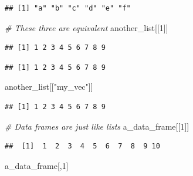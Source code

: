 \documentclass[]{book}
\newenvironment{Shaded}{\begin{snugshade}}{\end{snugshade}}
\newcommand{\CommentTok}[1]{\textcolor[rgb]{0.56,0.35,0.01}{\textit{#1}}}
\newcommand{\DecValTok}[1]{\textcolor[rgb]{0.00,0.00,0.81}{#1}}
\newcommand{\NormalTok}[1]{#1}
\newcommand{\OperatorTok}[1]{\textcolor[rgb]{0.81,0.36,0.00}{\textbf{#1}}}
\newcommand{\StringTok}[1]{\textcolor[rgb]{0.31,0.60,0.02}{#1}}
\begin{document}
\begin{enumerate}
\begin{verbatim}
## [1] "a" "b" "c" "d" "e" "f"
\end{verbatim}

\begin{Shaded}
\begin{Highlighting}[]
\CommentTok{# These three are equivalent}
\NormalTok{another_list[[}\DecValTok{1}\NormalTok{]]}
\end{Highlighting}
\end{Shaded}

\begin{verbatim}
## [1] 1 2 3 4 5 6 7 8 9
\end{verbatim}

\begin{Shaded}
\end{Shaded}

\begin{verbatim}
## [1] 1 2 3 4 5 6 7 8 9
\end{verbatim}

\begin{Shaded}
\begin{Highlighting}[]
\NormalTok{another_list[[}\StringTok{"my_vec"}\NormalTok{]]}
\end{Highlighting}
\end{Shaded}

\begin{verbatim}
## [1] 1 2 3 4 5 6 7 8 9
\end{verbatim}

\begin{Shaded}
\begin{Highlighting}[]
\CommentTok{# Data frames are just like lists}
\NormalTok{a_data_frame[[}\DecValTok{1}\NormalTok{]]}
\end{Highlighting}
\end{Shaded}

\begin{verbatim}
##  [1]  1  2  3  4  5  6  7  8  9 10
\end{verbatim}

\begin{Shaded}
\begin{Highlighting}[]
\NormalTok{a_data_frame[,}\DecValTok{1}\NormalTok{]}
\end{Highlighting}
\end{Shaded}


\end{enumerate}
\end{document}
